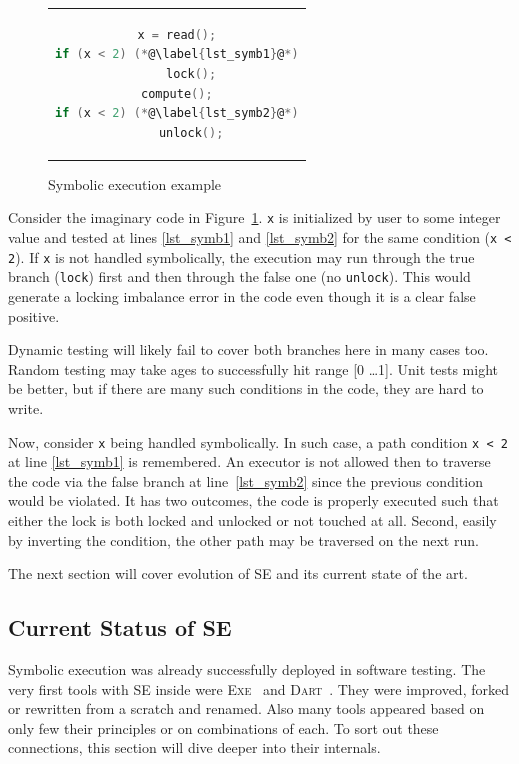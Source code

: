 \documentclass[11pt,a4paper]{article}
\begin{document}
\begin{figure}[htb]
\begin{center}
\begin{tabular}{c} %
\begin{lstlisting}[language=C]
x = read();
if (x < 2) (*@\label{lst_symb1}@*)
	lock();
compute();
if (x < 2) (*@\label{lst_symb2}@*)
	unlock();
\end{lstlisting}
\end{tabular}
\caption{Symbolic execution example}
\label{fig.symbolic}
\end{center}
\end{figure}

Consider the imaginary code in Figure~\ref{fig.symbolic}. \texttt{x} is
initialized by user to some integer value and tested at lines \ref{lst_symb1}
and \ref{lst_symb2} for the same condition (\texttt{x < 2}). If \texttt{x} is
not handled symbolically, the execution may run through the true branch
(\texttt{lock}) first and then through the false one (no \texttt{unlock}).
This would generate a locking imbalance error in the code even though it is a
clear false positive.

Dynamic testing will likely fail to cover both branches here in many cases
too. Random testing may take ages to successfully hit range [0 \ldots 1]. Unit
tests might be better, but if there are many such conditions in the code,
they are hard to write.

Now, consider \texttt{x} being handled symbolically. In such case, a path
condition \texttt{x < 2} at line \ref{lst_symb1} is remembered. An executor is
not allowed then to traverse the code via the false branch at
line~\ref{lst_symb2} since the previous condition would be violated. It has
two outcomes, the code is properly executed such that either the lock is both
locked and unlocked or not touched at all. Second, easily by inverting the
condition, the other path may be traversed on the next run.

The next section will cover evolution of SE and its current state of the art.

\subsection{Current Status of SE}
Symbolic execution was already successfully deployed in software testing. The
very first tools with SE inside were \textsc{Exe}~\cite{exe} and
\textsc{Dart}~\cite{dart}. They were improved, forked or rewritten from a
scratch and renamed. Also many tools appeared based on only few their
principles or on combinations of each. To sort out these connections, this
section will dive deeper into their internals.
\end{document}

